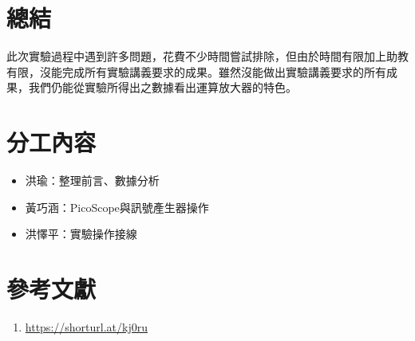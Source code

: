 \documentclass[12pt,a4paper]{article}
\begin{document}
\begin{CJK}{UTF8}{bkai}
\section{總結}
\hfill

此次實驗過程中遇到許多問題，花費不少時間嘗試排除，但由於時間有限加上助教有限，沒能完成所有實驗講義要求的成果。雖然沒能做出實驗講義要求的所有成果，我們仍能從實驗所得出之數據看出運算放大器的特色。 

\section{分工內容}
\hfill

\begin{itemize}
    \item 洪瑜：整理前言、數據分析
    \item 黃巧涵：PicoScope與訊號產生器操作
    \item 洪懌平：實驗操作接線
\end{itemize}

\section{參考文獻}
\hfill
\begin{enumerate}
    \item \url{https://shorturl.at/kj0ru}
\end{enumerate}


\end{CJK}
\end{document}
